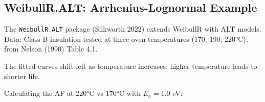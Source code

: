 \documentclass[
  letterpaper,
  DIV=11,
  numbers=noendperiod]{scrreprt}
\newenvironment{Shaded}{\begin{snugshade}}{\end{snugshade}}
\newcommand{\AttributeTok}[1]{\textcolor[rgb]{0.40,0.45,0.13}{#1}}
\newcommand{\ConstantTok}[1]{\textcolor[rgb]{0.56,0.35,0.01}{#1}}
\newcommand{\DecValTok}[1]{\textcolor[rgb]{0.68,0.00,0.00}{#1}}
\newcommand{\FunctionTok}[1]{\textcolor[rgb]{0.28,0.35,0.67}{#1}}
\newcommand{\NormalTok}[1]{\textcolor[rgb]{0.00,0.23,0.31}{#1}}
\newcommand{\OtherTok}[1]{\textcolor[rgb]{0.00,0.23,0.31}{#1}}
\newcommand{\SpecialCharTok}[1]{\textcolor[rgb]{0.37,0.37,0.37}{#1}}
\newcommand{\StringTok}[1]{\textcolor[rgb]{0.13,0.47,0.30}{#1}}
\begin{document}
\subsection{WeibullR.ALT: Arrhenius-Lognormal
Example}\label{weibullr.alt-arrhenius-lognormal-example}

The \texttt{WeibullR.ALT} package (Silkworth 2022) extends WeibullR with
ALT models. Data: Class B insulation tested at three oven temperatures
(170, 190, 220°C), from Nelson (1990) Table 4.1.

\begin{Shaded}
\end{Shaded}

The fitted curves shift left as temperature increases; higher
temperature leads to shorter life.

Calculating the AF at 220°C vs 170°C with \(E_a = 1.0\) eV:
\end{document}
